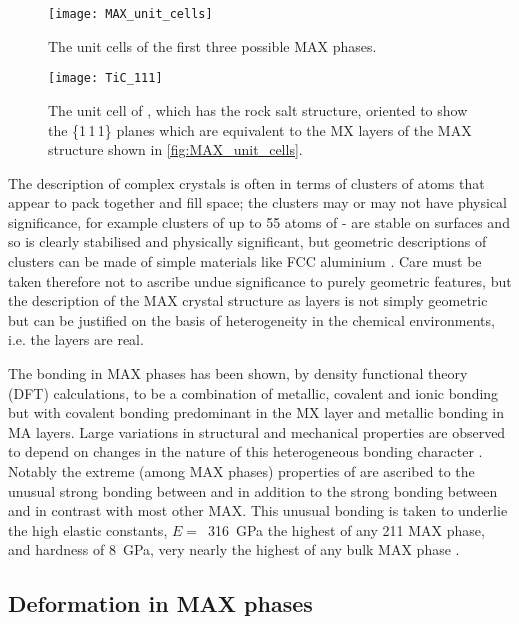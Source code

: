 \begin{figure}
\centering
\texttt{[image: MAX\_unit\_cells]}
\caption{The unit cells of the first three possible MAX phases.\label{fig:MAX_unit_cells}}
\end{figure}




\begin{figure}
\centering
{}
\texttt{[image: TiC\_111]}
\caption[The unit cell of .]{The unit cell of , which has the rock salt structure, oriented to show the \{1\,1\,1\} planes which are equivalent to the MX layers of the MAX structure shown in \autoref{fig:MAX_unit_cells}. \label{fig:TiC_111}}
\end{figure}


The description of complex crystals is often in terms of clusters of atoms that appear to pack together and fill space; the clusters may or may not have physical significance, for example clusters of up to 55 atoms of - are stable on surfaces and so is clearly stabilised and physically significant, but geometric descriptions of clusters can be made of simple materials like FCC aluminium \cite{Steurer2006}. Care must be taken therefore not to ascribe undue significance to purely geometric features, but the description of the MAX crystal structure as layers is not simply geometric but can be justified on the basis of heterogeneity in the chemical environments, i.e. the layers are real.

The bonding in MAX phases has been shown, by density functional theory (DFT) calculations, to be a combination of metallic, covalent and ionic bonding but with covalent bonding predominant in the MX layer and metallic bonding in MA layers. Large variations in structural and mechanical properties are observed to depend on changes in the nature of this heterogeneous bonding character \cite{Radovic2013,Sun2011}. Notably the extreme (among MAX phases) properties of  are ascribed to the unusual strong bonding between  and  in addition to the strong bonding between  and  in contrast with most other MAX. This unusual bonding is taken to underlie the high elastic constants, $E =$~\SI{316}{\giga\pascal} the highest of any 211 MAX phase, and hardness of \SI{8}{\giga\pascal}, very nearly the highest of any bulk MAX phase \cite{Feng2010,Sun2011}.

\subsection{Deformation in MAX phases}

